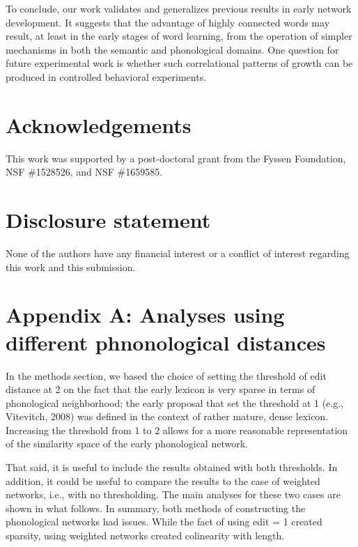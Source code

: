 \documentclass[english,floatsintext,man]{apa6}
\theoremstyle{definition}
\theoremstyle{definition}
\theoremstyle{definition}
\theoremstyle{remark}
\begin{document}
To conclude, our work validates and generalizes previous results in
early network development. It suggests that the advantage of highly
connected words may result, at least in the early stages of word
learning, from the operation of simpler mechanisms in both the semantic
and phonological domains. One question for future experimental work is
whether such correlational patterns of growth can be produced in
controlled behavioral experiments.

\vspace{1em}

\vspace{1em}

\section{Acknowledgements}\label{acknowledgements}

This work was supported by a post-doctoral grant from the Fyssen
Foundation, NSF \#1528526, and NSF \#1659585.

\section{Disclosure statement}\label{disclosure-statement}

None of the authors have any financial interest or a conflict of
interest regarding this work and this submission.

\clearpage

\section{Appendix A: Analyses using different phnonological
distances}\label{appendix-a-analyses-using-different-phnonological-distances}

In the methods section, we based the choice of setting the threshold of
edit distance at 2 on the fact that the early lexicon is very sparse in
terms of phonological neighborhood; the early proposal that set the
threshold at 1 (e.g., Vitevitch, 2008) was defined in the context of
rather mature, dense lexicon. Increasing the threshold from 1 to 2
allows for a more reasonable representation of the similarity space of
the early phonological network.

That said, it is useful to include the results obtained with both
thresholds. In addition, it could be useful to compare the results to
the case of weighted networks, i.e., with no thresholding. The main
analyses for these two cases are shown in what follows. In summary, both
methods of constructing the phonological networks had issues. While the
fact of using edit = 1 created sparsity, using weighted networks created
colinearity with length.
\end{document}
